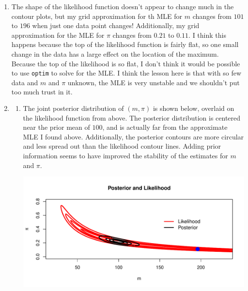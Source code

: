 \documentclass[12pt]{article}\usepackage[]{graphicx}\usepackage[]{color}
\newenvironment{knitrout}{}{} %
\begin{document}
\begin{enumerate}
\begin{enumerate}
\begin{knitrout}
\end{knitrout}

\item The shape of the likelihood function doesn't appear to change much in the contour plots, but my grid approximation for th MLE for $m$ changes from $101$ to $196$ when just one data point changes! Additionally, my grid approximation for the MLE for $\pi$ changes from $0.21$ to $0.11$.  I think this happens because the top of the likelihood function is fairly flat, so one small change in the data has a large effect on the location of the maximum. Because the top of the likelihood is so flat, I don't think it would be possible to use \verb+optim+ to solve for the MLE. I think the lesson here is that with so few data and $m$ and $\pi$ unknown, the MLE is very unstable and we shouldn't put too much trust in it.

\item \begin{enumerate}

\item The joint posterior distribution of $(m, \pi)$ is shown below, overlaid on the likelihood function from above. The posterior distribution is centered near the prior mean of $100$, and is actually far from the approximate MLE I found above. Additionally, the posterior contours are more circular and less spread out than the likelihood contour lines. Adding prior information seems to have improved the stability of the estimates for $m$ and $\pi$. 

\begin{knitrout}\footnotesize
{}\color{fgcolor}
\includegraphics[width=.9\linewidth]{figure/jointpost-1} 

\end{knitrout}


\end{enumerate}
\end{enumerate}
\end{enumerate}
\end{document}
